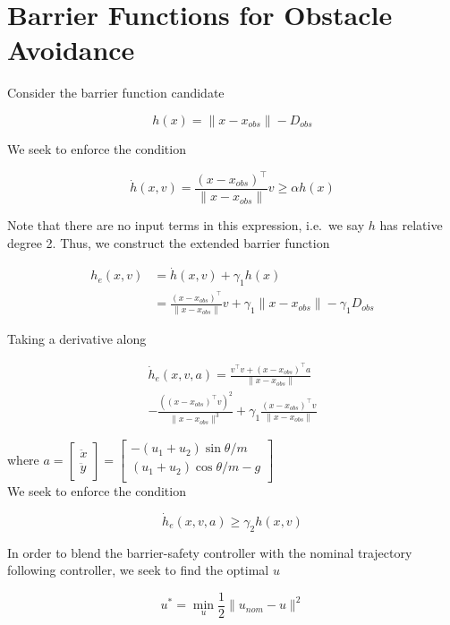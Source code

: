 \section{\textbf{Barrier Functions for Obstacle Avoidance}}

\noindent Consider the barrier function candidate

\[ h(x) = \| x - x_{obs} \| - D_{obs} \]

\noindent We seek to enforce the condition

\[ \dot{h}(x, v) = \frac{(x - x_{obs})^\top}{\|x - x_{obs} \|} v \geq \alpha h(x) \]

\noindent Note that there are no input terms in this expression, i.e.\ we say $h$ has relative degree 2. Thus, we construct the extended barrier function

\[ \begin{aligned}
    h_e(x,v) &= \dot{h}(x,v) + \gamma_1 h(x) \\
    &= \frac{(x - x_{obs})^\top}{\|x - x_{obs} \|} v + \gamma_1 \| x - x_{obs} \| - \gamma_1 D_{obs}
\end{aligned} \]

\noindent Taking a derivative along

\begin{multline}
    \dot{h}_e(x, v, a) = \frac{v^\top v + (x - x_{obs})^\top a}{\| x - x_{obs} \|} \\
    - \frac{((x - x_{obs})^\top v)^2}{\| x - x_{obs} \|^3}
    + \gamma_1 \frac{(x - x_{obs})^\top v}{\|x - x_{obs} \|}
\end{multline}

\noindent where $a = \begin{bmatrix}
    \ddot{x} \\ \ddot{y}
\end{bmatrix} = \begin{bmatrix}
    -(u_1 + u_2) \sin\theta / m \\
    (u_1 + u_2) \cos\theta / m - g \\
\end{bmatrix}$ \\

\noindent We seek to enforce the condition

\[ \dot{h}_e (x, v, a) \geq \gamma_2 h(x, v)\]

\noindent In order to blend the barrier-safety controller with the nominal trajectory following controller, we seek to find the optimal $u$

\[ u^* = \min_u \frac{1}{2} \| u_{nom} - u\|^2\]

